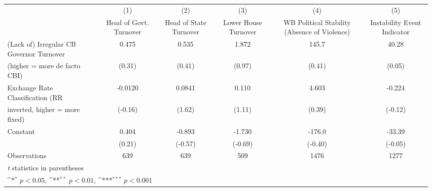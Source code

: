 {
\def\sym#1{\ifmmode^{#1}\else\(^{#1}\)\fi}
\begin{tabular}{l*{5}{c}}
\toprule
                                        &\multicolumn{1}{c}{(1)}&\multicolumn{1}{c}{(2)}&\multicolumn{1}{c}{(3)}&\multicolumn{1}{c}{(4)}&\multicolumn{1}{c}{(5)}\\
                                        &\multicolumn{1}{c}{Head of Govt. Turnover}&\multicolumn{1}{c}{Head of State Turnover}&\multicolumn{1}{c}{Lower House Turnover}&\multicolumn{1}{c}{WB Political Stability (Absence of Violence)}&\multicolumn{1}{c}{Instability Event Indicator}\\
\midrule
(Lack of) Irregular CB Governor Turnover&0.475         &0.535         &1.872         &145.7         &40.28         \\
(higher = more de facto CBI)            &(0.31)         &(0.41)         &(0.97)         &(0.41)         &(0.05)         \\
\addlinespace
Exchange Rate Classification (RR        &-0.0120         &0.0841         &0.110         &4.603         &-0.224         \\
inverted, higher = more fixed)          &(-0.16)         &(1.62)         &(1.11)         &(0.39)         &(-0.12)         \\
\addlinespace
Constant                                &0.404         &-0.893         &-1.730         &-176.0         &-33.39         \\
                                        &(0.21)         &(-0.57)         &(-0.69)         &(-0.40)         &(-0.05)         \\
\midrule
Observations                            &  639         &  639         &  509         & 1476         & 1277         \\
\bottomrule
\multicolumn{6}{l}{\footnotesize \textit{t} statistics in parentheses}\\
\multicolumn{6}{l}{\footnotesize \sym{*} \(p<0.05\), \sym{**} \(p<0.01\), \sym{***} \(p<0.001\)}\\
\end{tabular}
}
